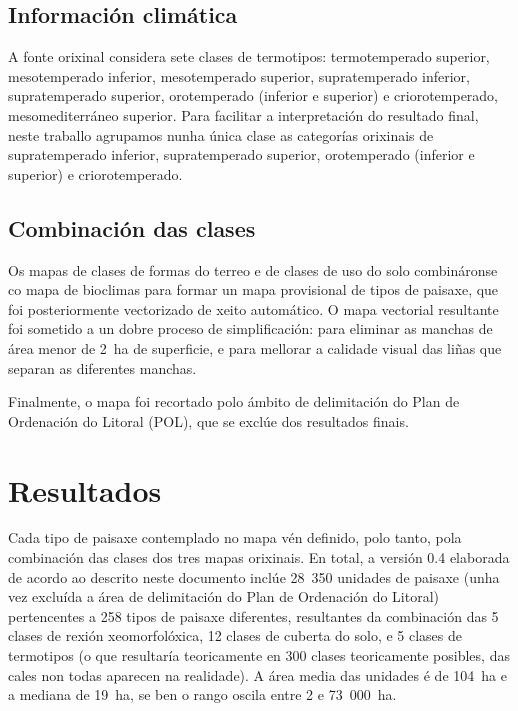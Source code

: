 \documentclass[11pt,a4paper]{article}
\begin{document}
\subsection{Información climática}

A fonte orixinal considera sete clases de termotipos: termotemperado superior, mesotemperado inferior, mesotemperado
superior, supratemperado inferior, supratemperado superior, orotemperado (inferior e superior) e criorotemperado, mesomediterráneo superior. Para facilitar a interpretación do resultado final, neste traballo agrupamos nunha única clase as categorías orixinais de supratemperado inferior, supratemperado superior, orotemperado (inferior e superior) e criorotemperado.

\subsection{Combinación das clases}

Os mapas de clases de formas do terreo e de clases de uso do solo combináronse co mapa de bioclimas para formar un mapa provisional de tipos de paisaxe, que foi posteriormente vectorizado de xeito automático. O mapa vectorial resultante foi sometido a un dobre proceso de simplificación: para eliminar as manchas de área menor de 2~ha de superficie, e para mellorar a calidade visual das liñas que separan as diferentes manchas.

Finalmente, o mapa foi recortado polo ámbito de delimitación do Plan de Ordenación do Litoral (POL), que se exclúe dos resultados finais.



\section{Resultados}

Cada tipo de paisaxe contemplado no mapa vén definido, polo tanto, pola combinación das clases dos tres mapas orixinais. En total, a versión 0.4 elaborada de acordo ao descrito neste documento inclúe 28~350 unidades de paisaxe (unha vez excluída a área de delimitación do Plan de Ordenación do Litoral) pertencentes a 258 tipos de paisaxe diferentes, resultantes da combinación das 5 clases de rexión xeomorfolóxica, 12 clases de cuberta do solo, e 5 clases de termotipos (o que resultaría teoricamente en 300 clases teoricamente posibles, das cales non todas aparecen na realidade). A área media das unidades é de 104~ha e a mediana de 19~ha, se ben o rango oscila entre 2 e 73~000~ha.
\end{document}
